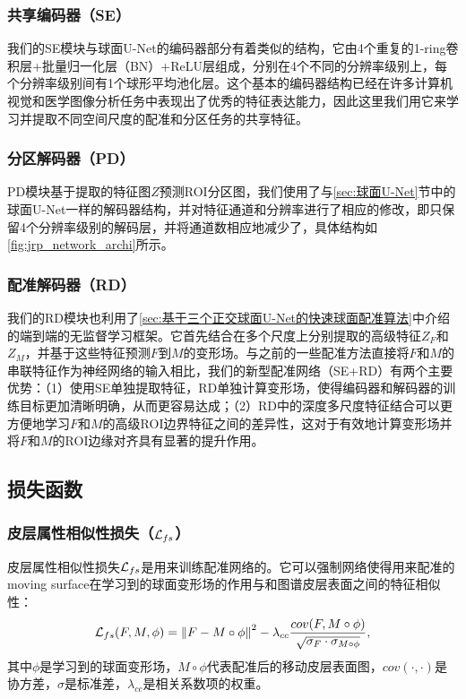 \subsubsection{共享编码器（SE）}
我们的SE模块与球面U-Net的编码器部分有着类似的结构，它由4个重复的1-ring卷积层+批量归一化层（BN）+ReLU层组成，分别在4个不同的分辨率级别上，每个分辨率级别间有1个球形平均池化层。这个基本的编码器结构已经在许多计算机视觉和医学图像分析任务中表现出了优秀的特征表达能力\cite{ronneberger2015u}，因此这里我们用它来学习并提取不同空间尺度的配准和分区任务的共享特征。

\subsubsection{分区解码器（PD）}
PD模块基于提取的特征图$Z$预测ROI分区图，我们使用了与\ref{sec:球面U-Net}节中的球面U-Net一样的解码器结构，并对特征通道和分辨率进行了相应的修改，即只保留4个分辨率级别的解码层，并将通道数相应地减少了，具体结构如\ref{fig:jrp_network_archi}所示。

\subsubsection{配准解码器（RD）}
我们的RD模块也利用了\ref{sec:基于三个正交球面U-Net的快速球面配准算法}中介绍的端到端的无监督学习框架。它首先结合在多个尺度上分别提取的高级特征$Z_F$和$Z_M$，并基于这些特征预测$F$到$M$的变形场。与之前的一些配准方法\cite{cheng2020cortical}直接将$F$和$M$的串联特征作为神经网络的输入相比，我们的新型配准网络（SE+RD）有两个主要优势：（1）使用SE单独提取特征，RD单独计算变形场，使得编码器和解码器的训练目标更加清晰明确，从而更容易达成；（2）RD中的深度多尺度特征结合可以更方便地学习$F$和$M$的高级ROI边界特征之间的差异性，这对于有效地计算变形场并将$F$和$M$的ROI边缘对齐具有显著的提升作用\cite{liu2019probabilistic}。



\subsection{损失函数}\label{sec:同时分区与配准的损失函数}
\subsubsection{皮层属性相似性损失（${\cal L}_{fs}$）}
皮层属性相似性损失${\cal L}_{fs}$是用来训练配准网络的。它可以强制网络使得用来配准的moving surface在学习到的球面变形场的作用与和图谱皮层表面之间的特征相似性：
\begin{equation}\label{eq:4.1}
{\cal L}_{fs}(F,M,\phi)={\| F-M\circ \phi \|}^2 -\lambda_{cc}\frac{cov(F,M\circ \phi)}{\sqrt{\sigma_F \cdot \sigma_{M\circ \phi}}},
\end{equation}
其中$\phi$是学习到的球面变形场，$M\circ \phi$代表配准后的移动皮层表面图，$cov(\cdot,\cdot)$是协方差，$\sigma$是标准差，$\lambda_{cc}$是相关系数项的权重。

